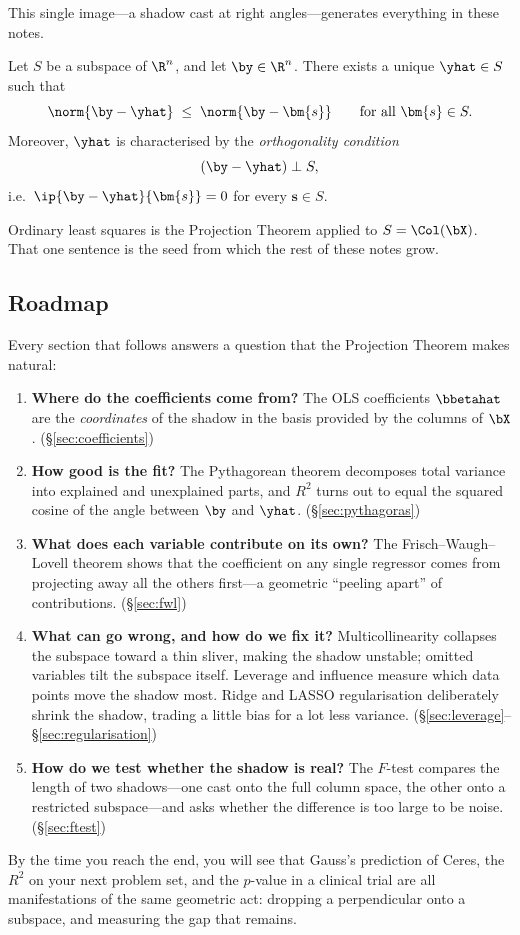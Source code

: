 This single image---a shadow cast at right angles---generates everything
in these notes.

\begin{theorem}%
  \label{thm:projection}
Let $S$ be a subspace of $\R^n$, and let $\by\in \R^n$.  There exists
a unique $\yhat\in S$ such that
\[
  \norm{\by - \yhat} \;\le\; \norm{\by - \bm{s}}
  \qquad\text{for all } \bm{s}\in S.
\]
Moreover, $\yhat$ is characterised by the \emph{orthogonality condition}
\[
  (\by - \yhat) \perp S,
\]
i.e.\ $\ip{\by - \yhat}{\bm{s}} = 0$ for every $\bm{s}\in S$.
\end{theorem}

Ordinary least squares is the Projection Theorem applied to
$S = \Col(\bX)$.
That one sentence is the seed from which the rest of these notes grow.

\subsection*{Roadmap}

Every section that follows answers a question that the Projection
Theorem makes natural:

\begin{enumerate}[leftmargin=2em]
  \item \textbf{Where do the coefficients come from?}
    The OLS coefficients $\bbetahat$ are the \emph{coordinates} of the
    shadow in the basis provided by the columns of $\bX$.
    (\S\ref{sec:coefficients})

  \item \textbf{How good is the fit?}
    The Pythagorean theorem decomposes total variance into explained
    and unexplained parts, and $R^2$ turns out to equal the squared
    cosine of the angle between $\by$ and $\yhat$.
    (\S\ref{sec:pythagoras})

  \item \textbf{What does each variable contribute on its own?}
    The Frisch--Waugh--Lovell theorem shows that the coefficient on any
    single regressor comes from projecting away all the others
    first---a geometric ``peeling apart'' of contributions.
    (\S\ref{sec:fwl})

  \item \textbf{What can go wrong, and how do we fix it?}
    Multicollinearity collapses the subspace toward a thin sliver,
    making the shadow unstable; omitted variables tilt the subspace
    itself.  Leverage and influence measure which data points move the
    shadow most.  Ridge and LASSO regularisation deliberately shrink the
    shadow, trading a little bias for a lot less variance.
    (\S\ref{sec:leverage}--\S\ref{sec:regularisation})

  \item \textbf{How do we test whether the shadow is real?}
    The $F$-test compares the length of two shadows---one cast onto the
    full column space, the other onto a restricted subspace---and asks
    whether the difference is too large to be noise.
    (\S\ref{sec:ftest})
\end{enumerate}

\noindent
By the time you reach the end, you will see that Gauss's prediction of
Ceres, the $R^2$ on your next problem set, and the $p$-value in a
clinical trial are all manifestations of the same geometric act:
dropping a perpendicular onto a subspace, and measuring the gap that
remains.
